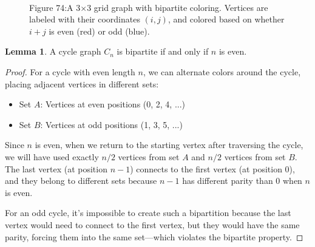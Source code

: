\documentclass{article}
\theoremstyle{definition}
\newtheorem{lemma}{Lemma}
\begin{document}
\begin{figure}[h]
\centering
{}
\\
\small Figure 74:A 3×3 grid graph with bipartite coloring. Vertices are labeled with their coordinates $(i,j)$, and colored based on whether $i+j$ is even (red) or odd (blue).
\end{figure}


\begin{lemma}
A cycle graph $C_n$ is bipartite if and only if $n$ is even.
\end{lemma}

\begin{proof}
For a cycle with even length $n$, we can alternate colors around the cycle, placing adjacent vertices in different sets:
\begin{itemize}
    \item Set $A$: Vertices at even positions (0, 2, 4, ...)
    \item Set $B$: Vertices at odd positions (1, 3, 5, ...)
\end{itemize}

Since $n$ is even, when we return to the starting vertex after traversing the cycle, we will have used exactly $n/2$ vertices from set $A$ and $n/2$ vertices from set $B$. The last vertex (at position $n-1$) connects to the first vertex (at position 0), and they belong to different sets because $n-1$ has different parity than 0 when $n$ is even.

For an odd cycle, it's impossible to create such a bipartition because the last vertex would need to connect to the first vertex, but they would have the same parity, forcing them into the same set—which violates the bipartite property.
\end{proof}
\end{document}
